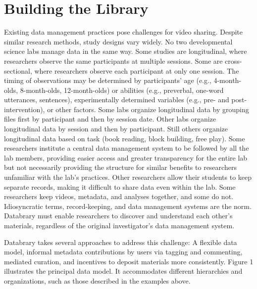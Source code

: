 \documentclass{sig-alternate}
\begin{document}
\section{Building the Library}

Existing data management practices pose challenges for video sharing.
Despite similar research methods, study designs vary widely. No two
developmental science labs manage data in the same way. Some studies are
longitudinal, where researchers observe the same participants at
multiple sessions. Some are cross-sectional, where researchers observe
each participant at only one session. The timing of observations may be
determined by participants’ age (e.g., 4-month-olds, 8-month-olds,
12-month-olds) or abilities (e.g., preverbal, one-word utterances,
sentences), experimentally determined variables (e.g., pre- and
post-intervention), or other factors. Some labs organize longitudinal
data by grouping files first by participant and then by session date.
Other labs organize longitudinal data by session and then by
participant. Still others organize longitudinal data based on task (book
reading, block building, free play). Some researchers institute a
central data management system to be followed by all the lab members,
providing easier access and greater transparency for the entire lab but
not necessarily providing the structure for similar benefits to
researchers unfamiliar with the lab’s practices. Other researchers allow
their students to keep separate records, making it difficult to share
data even within the lab. Some researchers keep videos, metadata, and
analyses together, and some do not. Idiosyncratic terms, record-keeping,
and data management systems are the norm. Databrary must enable
researchers to discover and understand each other’s materials,
regardless of the original investigator’s data management system.

Databrary takes several approaches to address this challenge: A flexible
data model, informal metadata contributions by users via tagging and
commenting, mediated curation, and incentives to deposit materials more
consistently. Figure 1 illustrates the principal data model. It
accommodates different hierarchies and organizations, such as those
described in the examples above.
\end{document}

